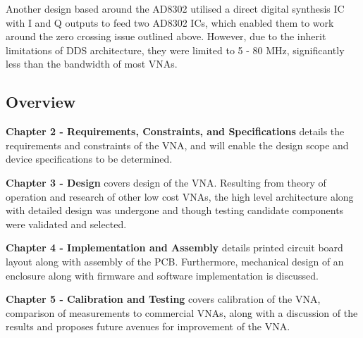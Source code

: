 Another design based around the AD8302 \cite{torre_vna} utilised a direct digital synthesis IC with I and Q outputs to feed two AD8302 ICs, which enabled them to work around the zero crossing issue outlined above. However, due to the inherit limitations of DDS architecture, they were limited to 5 - 80 MHz, significantly less than the bandwidth of most VNAs. 

\subsection{Overview}

\textbf{Chapter 2 - Requirements, Constraints, and Specifications} details the requirements and constraints of the VNA, and will enable the design scope and device specifications to be determined. 

\textbf{Chapter 3 - Design} covers design of the VNA. Resulting from theory of operation and research of other low cost VNAs, the high level architecture along with detailed design was undergone and though testing candidate components were validated and selected.  

\textbf{Chapter 4 - Implementation and Assembly} details printed circuit board layout along with assembly of the PCB. Furthermore, mechanical design of an enclosure along with firmware and software implementation is discussed. 

\textbf{Chapter 5 - Calibration and Testing} covers calibration of the VNA, comparison of measurements to commercial VNAs, along with a discussion of the results and proposes future avenues for improvement of the VNA. 